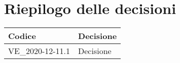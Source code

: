 \section{Riepilogo delle decisioni}
\setcounter{table}{-1}
{
\centering
\renewcommand{\arraystretch}{1.5}
\begin{longtable}{>{\centering}p{} >{}p{}}
\rowcolor{azzurro1}
\textbf{Codice} &
\centerline{\textbf{Decisione}}\\
\endhead

VE{\_}2020-12-11.1 & Decisione\\
\end{longtable}
}